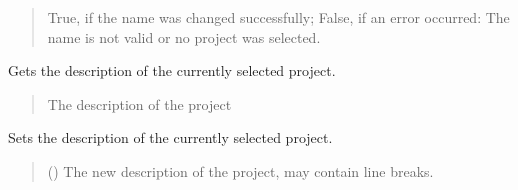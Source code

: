 \documentclass[letterpaper,10pt,english]{sphinxmanual}
\begin{document}
\begin{fulllineitems}
\begin{fulllineitems}
\begin{quote}
\begin{description}
\sphinxAtStartPar
True, if the name was changed successfully; False, if an error occurred: The name is not valid or no project was selected.

\sphinxAtStartPar
{}

\end{description}\end{quote}

\end{fulllineitems}


\begin{fulllineitems}
\label{\detokenize{apidoc/src.osm_configurator.control:src.osm_configurator.control.control.Control.get_project_description}}
\pysigstartsignatures
{}
\pysigstopsignatures
\sphinxAtStartPar
Gets the description of the currently selected project.
\begin{quote}\begin{description}
\sphinxAtStartPar
The description of the project

\sphinxAtStartPar
{}

\end{description}\end{quote}

\end{fulllineitems}


\begin{fulllineitems}
\label{\detokenize{apidoc/src.osm_configurator.control:src.osm_configurator.control.control.Control.set_project_description}}
\pysigstartsignatures
{}
\pysigstopsignatures
\sphinxAtStartPar
Sets the description of the currently selected project.
\begin{quote}\begin{description}
\sphinxAtStartPar
{} () \textendash{} The new description of the project, may contain line breaks.


\end{description}
\end{quote}
\end{fulllineitems}
\end{fulllineitems}
\end{document}
